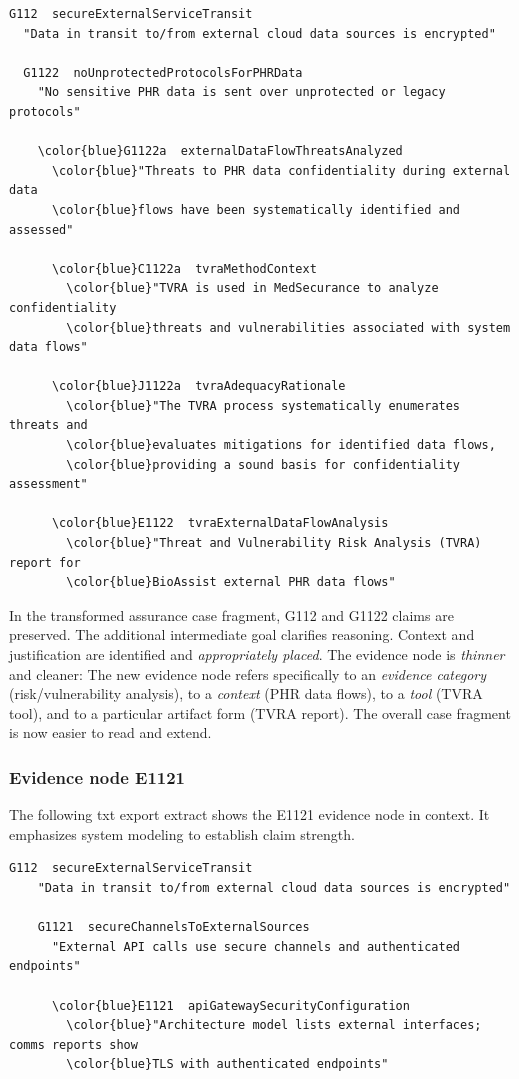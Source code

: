 \documentclass{article}
\begin{document}
\begin{Verbatim}[commandchars=\\\{\}]
G112  secureExternalServiceTransit
  "Data in transit to/from external cloud data sources is encrypted"

  G1122  noUnprotectedProtocolsForPHRData
    "No sensitive PHR data is sent over unprotected or legacy protocols"
      
    \color{blue}G1122a  externalDataFlowThreatsAnalyzed
      \color{blue}"Threats to PHR data confidentiality during external data
      \color{blue}flows have been systematically identified and assessed"
            
      \color{blue}C1122a  tvraMethodContext
        \color{blue}"TVRA is used in MedSecurance to analyze confidentiality
        \color{blue}threats and vulnerabilities associated with system data flows"
                
      \color{blue}J1122a  tvraAdequacyRationale
        \color{blue}"The TVRA process systematically enumerates threats and
        \color{blue}evaluates mitigations for identified data flows,
        \color{blue}providing a sound basis for confidentiality assessment"

      \color{blue}E1122  tvraExternalDataFlowAnalysis
        \color{blue}"Threat and Vulnerability Risk Analysis (TVRA) report for
        \color{blue}BioAssist external PHR data flows"
\end{Verbatim}
In the transformed assurance case fragment, G112 and G1122 claims are preserved.
The additional intermediate goal clarifies reasoning.
Context and justification are identified and \emph{appropriately placed}.
The evidence node is \emph{thinner} and cleaner:
The new evidence node refers specifically to an \emph{evidence category} (risk/vulnerability analysis), to a \emph{context} (PHR data flows), to a \emph{tool} (TVRA tool), and to a particular artifact form (TVRA report).
The overall case fragment is now easier to read and extend.

\subsubsection{Evidence node E1121}

The following txt export extract shows the E1121 evidence node in context. It emphasizes system modeling to establish claim strength.
\clearpage
\begin{Verbatim}[commandchars=\\\{\}]
  G112  secureExternalServiceTransit
    "Data in transit to/from external cloud data sources is encrypted"

    G1121  secureChannelsToExternalSources
      "External API calls use secure channels and authenticated endpoints"

      \color{blue}E1121  apiGatewaySecurityConfiguration
        \color{blue}"Architecture model lists external interfaces; comms reports show
        \color{blue}TLS with authenticated endpoints"
\end{Verbatim}
\end{document}
